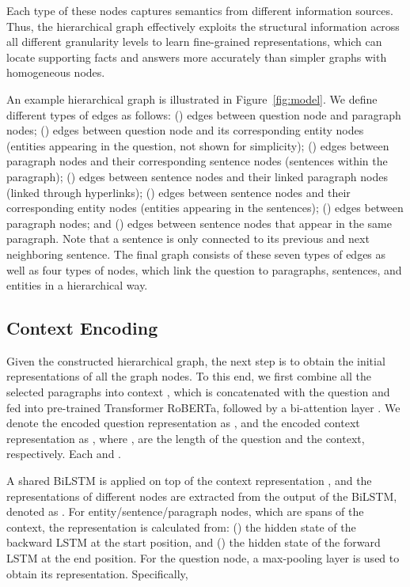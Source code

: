 \documentclass[11pt,a4paper]{article}
\begin{document}
Each type of these nodes captures semantics from different information sources. Thus, the hierarchical graph effectively exploits the structural information across all different granularity levels to learn fine-grained representations, which can locate supporting facts and answers more accurately than simpler graphs with homogeneous nodes. 

An example hierarchical graph is illustrated in Figure~\ref{fig:model}.  
We define different types of edges as follows: () edges between question node and paragraph nodes; () edges between question node and its corresponding entity nodes (entities appearing in the question, not shown for simplicity); () edges between paragraph nodes and their corresponding sentence nodes (sentences within the paragraph); () edges between sentence nodes and their linked paragraph nodes (linked through hyperlinks); () edges between sentence nodes and their corresponding entity nodes (entities appearing in the sentences); () edges between paragraph nodes; and () edges between sentence nodes that appear in the same paragraph. Note that a sentence is only connected to its previous and next neighboring sentence. The final graph consists of these seven types of edges as well as four types of nodes, which link the question to paragraphs, sentences, and entities in a hierarchical way.

\subsection{Context Encoding} \label{sec:context_encoding}
Given the constructed hierarchical graph, the next step is to obtain the initial representations of all the graph nodes. To this end, we first combine all the selected paragraphs into context , which is concatenated with the question  and fed into pre-trained Transformer RoBERTa, followed by a bi-attention layer \cite{bidaf}. We denote the encoded question representation as , and the encoded context representation as  , where ,  are the length of the question and the context, respectively. Each  and . 

A shared BiLSTM is applied on top of the context representation , and the representations of different nodes are extracted from the output of the BiLSTM, denoted as . 
For entity/sentence/paragraph nodes, which are spans of the context, the representation is calculated from: () the hidden state of the backward LSTM at the start position, and () the hidden state of the forward LSTM at the end position. For the question node, a max-pooling layer is used to obtain its representation. Specifically,
\end{document}
